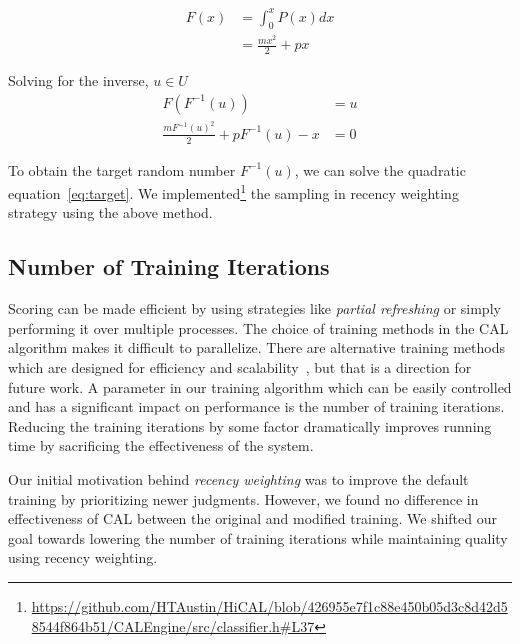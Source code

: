 \begin{equation}
\begin{split}
    F(x) & = \int_0^x P(x)dx \\
         & = \frac{mx^2}{2} + px
\end{split}
\end{equation}

Solving for the inverse, $u \in U$
\begin{equation}
\begin{split}
\label{eq:target}
    F(F^{-1}(u)) & = u \\
    \frac{mF^{-1}(u)^2}{2} + pF^{-1}(u) - x & = 0
\end{split}
\end{equation}

To obtain the target random number $F^{-1}(u)$, we can solve the quadratic
equation~\ref{eq:target}. We
implemented\footnote{\url{https://github.com/HTAustin/HiCAL/blob/426955e7f1c88e450b05d3c8d42d58544f864b51/CALEngine/src/classifier.h\#L37}}
    the sampling in recency weighting strategy using the above method.

\subsection{Number of Training Iterations}
Scoring can be made efficient by using strategies like \textit{partial
refreshing} or simply performing it over multiple processes. The choice of
training methods in the CAL algorithm makes it difficult to parallelize. There are
alternative training methods which are designed for efficiency and
scalability~\cite{andrew2007scalable,peng2013evaluating},
but that is a direction for future work. A parameter in our training algorithm
which can be easily controlled and has a significant impact on performance is
the number of training iterations. Reducing the training iterations by some
factor dramatically improves running time by sacrificing the effectiveness
of the system.

Our initial motivation behind \textit{recency weighting} was to improve the
default training
by prioritizing newer judgments. However, we found no difference in
effectiveness of CAL between the original and modified training. We
shifted our goal towards lowering the number of training iterations while
maintaining quality using recency weighting.


